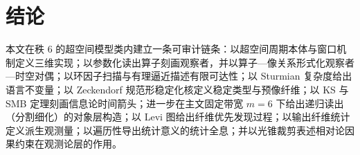 \section{结论}

本文在秩 $6$ 的超空间模型类内建立一条可审计链条：以超空间周期本体与窗口机制定义三维实现；以参数化读出算子刻画观察者，并以算子—像关系形式化观察者—时空对偶；以环因子扫描与有理逼近描述有限可达性；以 Sturmian 复杂度给出语言不变量；以 Zeckendorf 规范形稳定化核定义稳定类型与预像纤维；以 KS 与 SMB 定理刻画信息论时间箭头；进一步在主文固定带宽 $m=6$ 下给出递归读出（分割细化）的对象层构造；以 Levi 图给出纤维优先发现过程；以输出纤维统计定义派生观测量；以遍历性导出统计意义的统计全息；并以光锥裁剪表述相对论因果约束在观测论层的作用。

